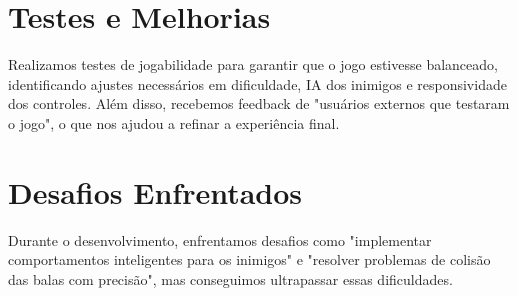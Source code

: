 \documentclass[a4paper]{article}
\begin{document}
\section{Testes e Melhorias}

Realizamos testes de jogabilidade para garantir que o jogo estivesse balanceado, identificando ajustes necessários em dificuldade, IA dos inimigos e responsividade dos controles. Além disso, recebemos feedback de "usuários externos que testaram o jogo", o que nos ajudou a refinar a experiência final.

\section{Desafios Enfrentados}

Durante o desenvolvimento, enfrentamos desafios como "implementar comportamentos inteligentes para os inimigos" e "resolver problemas de colisão das balas com precisão", mas conseguimos ultrapassar essas dificuldades.
\end{document}
